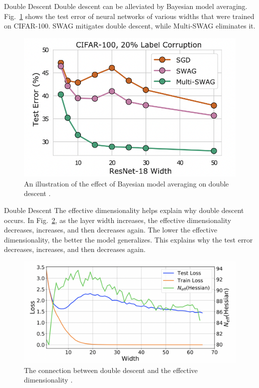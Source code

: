 \documentclass{beamer}
\begin{document}
\begin{frame}{Double Descent}
    Double descent can be alleviated by Bayesian model averaging. Fig.~\ref{fig:double_descent_and_bma} shows the test error of neural networks of various widths that were trained on CIFAR-100. SWAG mitigates double descent, while Multi-SWAG eliminates it.
    \begin{figure}
        \centering
        \includegraphics[scale=0.5]{double_descent_and_bma}
        \caption{An illustration of the effect of Bayesian model averaging on double descent \cite{pml2Book}.}
        \label{fig:double_descent_and_bma}
    \end{figure}
\end{frame}

\begin{frame}{Double Descent}
    The effective dimensionality helps explain why double descent occurs. In Fig.~\ref{fig:double_descent_and_effective_dimensionality}, as the layer width increases, the effective dimensionality decreases, increases, and then decreases again. The lower the effective dimensionality, the better the model generalizes. This explains why the test error decreases, increases, and then decreases again.
    \begin{figure}
        \centering
        \includegraphics[scale=0.4]{double_descent_and_effective_dimensionality}
        \caption{The connection between double descent and the effective dimensionality \cite{pml2Book}.}
        \label{fig:double_descent_and_effective_dimensionality}
    \end{figure}
\end{frame}
\end{document}
